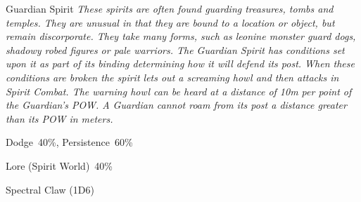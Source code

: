 \begin{monsterbox}{Guardian Spirit}
	\textit{These spirits are often found guarding treasures, tombs and temples. They are unusual in that they are bound to a location or object, but remain discorporate. They take many forms, such as leonine monster guard dogs, shadowy robed figures or pale warriors. The Guardian Spirit has conditions set upon it as part of its binding determining how it will defend its post. When these conditions are broken the spirit lets out a screaming howl and then attacks in Spirit Combat. The warning howl can be heard at a distance of 10m per point of the Guardian’s POW. A Guardian cannot roam from its post a distance greater than its POW in meters.}\\
	\rpghline
	\basics[%
	powerpoints = 17,
	movementrate = 30m,
	plunderrating = (depends on the Treasure being guarded)
	]
	\rpghline%
	\stats[ %
		STR = -,
		CON = -,
		DEX = -,
		SIZ = -,
		INT = 2D6    (7),
		POW = 3D6+6  (17),
		CHA = 3D6    (11)
	]
	\rpghline%
	\begin{rpg-monsteraction}[Resistances]
		Dodge~40\%, Persistence~60\%
	\end{rpg-monsteraction}
	\begin{rpg-monsteraction}[Knowledge]
		Lore (Spirit World)~40\%
	\end{rpg-monsteraction}
	\begin{rpg-monsteraction}
		Spectral Claw (1D6)
	\end{rpg-monsteraction}
\end{monsterbox}

\newpage 
